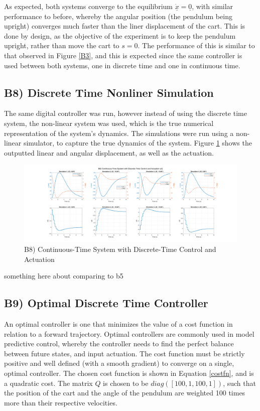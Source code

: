 \documentclass{article}
\begin{document}
As expected, both systems converge to the equilibrium $\underline{\dot x}=\underline{0}$, with similar performance to before, whereby the angular position (the pendulum being upright) converges much faster than the liner displacement of the cart. This is done by design, as the objective of the experiment is to keep the pendulum upright, rather than move the cart to $s=0$. The performance of this is similar to that observed in Figure \ref{B3}, and this is expected since the same controller is used between both systems, one in discrete time and one in continuous time.

\subsection*{B8) Discrete Time Nonliner Simulation}
The same digital controller was run, however instead of using the discrete time system, the non-linear system was used, which is the true numerical representation of the system's dynamics. The simulations were run using a non-linear simulator, to capture the true dynamics of the system. Figure \ref{B8} shows the outputted linear and angular displacement, as well as the actuation.

\begin{figure}[H]
    \centering
    \includegraphics[width=\textwidth]{figures/b8.png}
    \caption{B8) Continuous-Time System with Discrete-Time Control and Actuation}
    \label{B8}
\end{figure}


something here about comparing to b5

\subsection*{B9) Optimal Discrete Time Controller}
An optimal controller is one that minimizes the value of a cost function in relation to a forward trajectory. Optimal controllers are commonly used in model predictive control, whereby the controller needs to find the perfect balance between future states, and input actuation. The cost function must be strictly positive and well defined (with a smooth gradient) to converge on a single, optimal controller. The chosen cost function is shown in Equation \ref{costfn}, and is a quadratic cost. The matrix $Q$ is chosen to be $diag([100, 1, 100, 1])$, such that the position of the cart and the angle of the pendulum are weighted 100 times more than their respective velocities.
\end{document}
